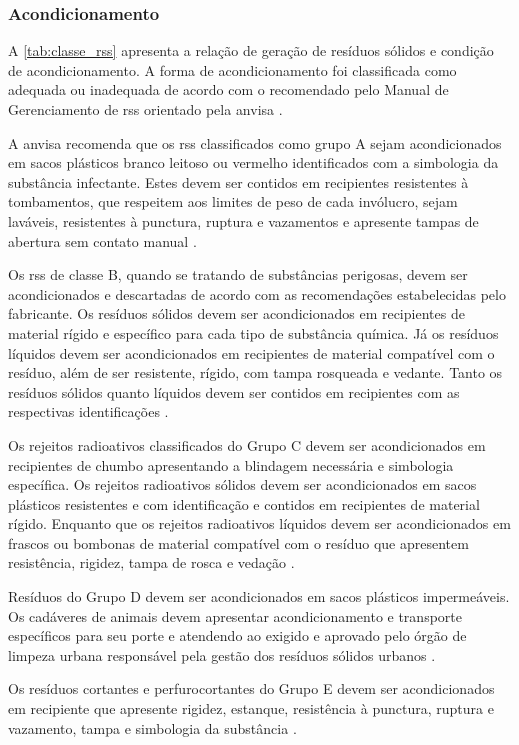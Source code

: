 	\subsubsection{Acondicionamento}
	A \autoref{tab:classe_rss} apresenta a relação de geração de resíduos sólidos e condição de acondicionamento. A forma de acondicionamento foi classificada como adequada ou inadequada de acordo com o recomendado pelo Manual de Gerenciamento de \gls{rss} orientado pela \gls{anvisa} \cite{anvisa:2006}. 
	
	A \gls{anvisa} recomenda que os \gls{rss} classificados como grupo A sejam acondicionados em sacos plásticos branco leitoso ou vermelho identificados com a simbologia da substância infectante. Estes devem ser contidos em recipientes resistentes à tombamentos, que respeitem aos limites de peso de cada invólucro, sejam laváveis, resistentes à punctura, ruptura e vazamentos e apresente tampas de abertura sem contato manual \cite{anvisa:2006}.

	Os \gls{rss} de classe B, quando se tratando de substâncias perigosas, devem ser acondicionados e descartadas de acordo com as recomendações estabelecidas pelo fabricante. Os resíduos sólidos devem ser acondicionados em recipientes de material rígido e específico para cada tipo de substância química. Já os resíduos líquidos devem ser acondicionados em recipientes de material compatível com o resíduo, além de ser resistente, rígido, com tampa rosqueada e vedante. Tanto os resíduos sólidos quanto líquidos devem ser contidos em recipientes com as respectivas identificações \cite{anvisa:2006}.

	Os rejeitos radioativos classificados do Grupo C devem ser acondicionados em recipientes de chumbo apresentando a blindagem necessária e simbologia específica. Os rejeitos radioativos sólidos devem ser acondicionados em sacos plásticos resistentes e com identificação e contidos em recipientes de material rígido. Enquanto que os rejeitos radioativos líquidos devem ser acondicionados em frascos ou bombonas de material compatível com o resíduo que apresentem resistência, rigidez, tampa de rosca e vedação \cite{anvisa:2006}. 

	Resíduos do Grupo D devem ser acondicionados em sacos plásticos impermeáveis. Os cadáveres de animais devem apresentar acondicionamento e transporte específicos para seu porte e atendendo ao exigido e aprovado pelo órgão de limpeza urbana responsável pela gestão dos resíduos sólidos urbanos \cite{anvisa:2006}.
	
	Os resíduos cortantes e perfurocortantes do Grupo E devem ser acondicionados em recipiente que apresente rigidez, estanque, resistência à punctura, ruptura e vazamento, tampa e simbologia da substância \cite{anvisa:2006}.
	
